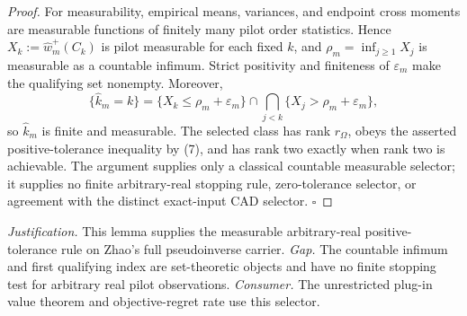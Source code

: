 \documentclass{article}
\begin{document}
\begin{proof}
For measurability, empirical means, variances, and endpoint cross moments are measurable functions of finitely many pilot order statistics.  Hence \(X_k:=\widehat w_m^+(C_k)\) is pilot measurable for each fixed \(k\), and \(\rho_m=\inf_{j\ge1}X_j\) is measurable as a countable infimum.  Strict positivity and finiteness of \(\varepsilon_m\) make the qualifying set nonempty.  Moreover,
\[
\{\widehat k_m=k\}
=\{X_k\le\rho_m+\varepsilon_m\}
\cap\bigcap_{j<k}\{X_j>\rho_m+\varepsilon_m\},
\tag{8}
\]
so \(\widehat k_m\) is finite and measurable.  The selected class has rank \(r_\Omega\), obeys the asserted positive-tolerance inequality by (7), and has rank two exactly when rank two is achievable.  The argument supplies only a classical countable measurable selector; it supplies no finite arbitrary-real stopping rule, zero-tolerance selector, or agreement with the distinct exact-input CAD selector. \(\square\)
\end{proof}
\par\smallskip\noindent \textit{Justification.} This lemma supplies the measurable arbitrary-real positive-tolerance rule on Zhao's full pseudoinverse carrier. \textit{Gap.} The countable infimum and first qualifying index are set-theoretic objects and have no finite stopping test for arbitrary real pilot observations. \textit{Consumer.} The unrestricted plug-in value theorem and objective-regret rate use this selector.
\end{document}
